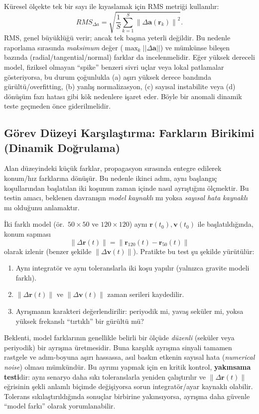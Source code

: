 Küresel ölçekte tek bir sayı ile kıyaslamak için RMS metriği kullanılır:
\begin{equation}
RMS_{\Delta a}=\sqrt{\frac{1}{S}\sum_{k=1}^{S}\left\|\Delta\mathbf a(\mathbf r_k)\right\|^{2}}.
\end{equation}
RMS, genel büyüklüğü verir; ancak tek başına yeterli değildir. Bu nedenle raporlama sırasında
\emph{maksimum} değer ($\max_k ||\Delta\mathbf a||$) ve mümkünse bileşen bazında (radial/tangential/normal) farklar da
incelenmelidir. Eğer yüksek dereceli model, fiziksel olmayan ``spike'' benzeri sivri uçlar veya lokal patlamalar gösteriyorsa,
bu durum çoğunlukla (a) aşırı yüksek derece bandında gürültü/overfitting, (b) yanlış normalizasyon, (c) sayısal instabilite
veya (d) dönüşüm fazı hatası gibi kök nedenlere işaret eder. Böyle bir anomali dinamik teste geçmeden önce giderilmelidir.

\newpage
\subsection{Görev Düzeyi Karşılaştırma: Farkların Birikimi (Dinamik Doğrulama)}
Alan düzeyindeki küçük farklar, propagasyon sırasında entegre edilerek konum/hız farklarına dönüşür.
Bu nedenle ikinci adım, aynı başlangıç koşullarından başlatılan iki koşunun zaman içinde nasıl ayrıştığını ölçmektir.
Bu testin amacı, beklenen davranışın \emph{model kaynaklı} mı yoksa \emph{sayısal hata kaynaklı} mı olduğunu anlamaktır.

İki farklı model (ör.\ $50\times50$ ve $120\times120$) aynı $\mathbf r(t_0),\mathbf v(t_0)$ ile başlatıldığında,
konum sapması
\begin{equation}
\left\|\Delta \mathbf{r}(t)\right\|
= \left\|\mathbf{r}_{120}(t)-\mathbf{r}_{50}(t)\right\|
\end{equation}
olarak izlenir (benzer şekilde $\|\Delta\mathbf v(t)\|$). Pratikte bu test şu şekilde yürütülür:
\begin{enumerate}
\item Aynı integratör ve aynı toleranslarla iki koşu yapılır (yalnızca gravite modeli farklı).
\item $\|\Delta\mathbf r(t)\|$ ve $\|\Delta\mathbf v(t)\|$ zaman serileri kaydedilir.
\item Ayrışmanın karakteri değerlendirilir: periyodik mi, yavaş seküler mi, yoksa yüksek frekanslı ``tırtıklı'' bir gürültü mü?
\end{enumerate}
Beklenti, model farklarının genellikle belirli bir ölçüde \emph{düzenli} (seküler veya periyodik) bir ayrışma üretmesidir.
Buna karşılık ayrışma sinyali tamamen rastgele ve adım-boyuna aşırı hassassa, asıl baskın etkenin sayısal hata
(\textit{numerical noise}) olması mümkündür. Bu ayrımı yapmak için en kritik kontrol,
\textbf{yakınsama testi}dir: aynı senaryo daha sıkı toleranslarla yeniden çalıştırılır ve $\|\Delta\mathbf r(t)\|$ eğrisinin
şekli anlamlı biçimde değişiyorsa sorun integratör/ayar kaynaklı olabilir. Tolerans sıkılaştırıldığında sonuçlar birbirine
yakınsıyorsa, ayrışma daha güvenle ``model farkı'' olarak yorumlanabilir.

